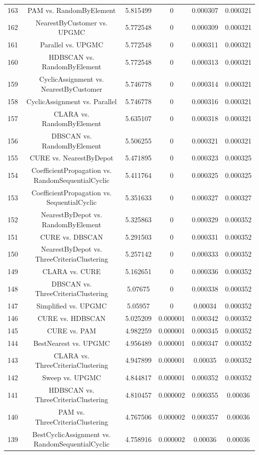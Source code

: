 \documentclass[a4paper,10pt]{article}
\begin{document}
\begin{landscape}
\begin{table}[!htp]
\begin{tabular}{cccccc}
163&PAM vs. RandomByElement&5.815499&0&0.000307&0.000321\\
162&NearestByCustomer vs. UPGMC&5.772548&0&0.000309&0.000321\\
161&Parallel vs. UPGMC&5.772548&0&0.000311&0.000321\\
160&HDBSCAN vs. RandomByElement&5.772548&0&0.000313&0.000321\\
159&CyclicAssignment vs. NearestByCustomer&5.746778&0&0.000314&0.000321\\
158&CyclicAssignment vs. Parallel&5.746778&0&0.000316&0.000321\\
157&CLARA vs. RandomByElement&5.635107&0&0.000318&0.000321\\
156&DBSCAN vs. RandomByElement&5.506255&0&0.000321&0.000321\\
155&CURE vs. NearestByDepot&5.471895&0&0.000323&0.000325\\
154&CoefficientPropagation vs. RandomSequentialCyclic&5.411764&0&0.000325&0.000325\\
153&CoefficientPropagation vs. SequentialCyclic&5.351633&0&0.000327&0.000327\\
152&NearestByDepot vs. RandomByElement&5.325863&0&0.000329&0.000352\\
151&CURE vs. DBSCAN&5.291503&0&0.000331&0.000352\\
150&NearestByDepot vs. ThreeCriteriaClustering&5.257142&0&0.000333&0.000352\\
149&CLARA vs. CURE&5.162651&0&0.000336&0.000352\\
148&DBSCAN vs. ThreeCriteriaClustering&5.07675&0&0.000338&0.000352\\
147&Simplified vs. UPGMC&5.05957&0&0.00034&0.000352\\
146&CURE vs. HDBSCAN&5.025209&0.000001&0.000342&0.000352\\
145&CURE vs. PAM&4.982259&0.000001&0.000345&0.000352\\
144&BestNearest vs. UPGMC&4.956489&0.000001&0.000347&0.000352\\
143&CLARA vs. ThreeCriteriaClustering&4.947899&0.000001&0.00035&0.000352\\
142&Sweep vs. UPGMC&4.844817&0.000001&0.000352&0.000352\\
141&HDBSCAN vs. ThreeCriteriaClustering&4.810457&0.000002&0.000355&0.00036\\
140&PAM vs. ThreeCriteriaClustering&4.767506&0.000002&0.000357&0.00036\\
139&BestCyclicAssignment vs. RandomSequentialCyclic&4.758916&0.000002&0.00036&0.00036\\

\end{tabular}
\end{table}
\end{landscape}
\end{document}
